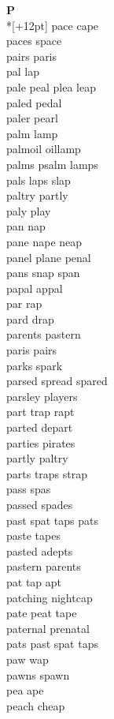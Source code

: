 \vspace{14pt}
\noindent\textbf{\Large P}\\*[+12pt]
pace cape\\
paces space\\
pairs paris\\
pal lap\\
pale peal plea leap\\
paled pedal\\
paler pearl\\
palm lamp\\
palmoil oillamp\\
palms psalm lamps\\
pals laps slap\\
paltry partly\\
paly play\\
pan nap\\
pane nape neap\\
panel plane penal\\
pans snap span\\
papal appal\\
par rap\\
pard drap\\
parents pastern\\
paris pairs\\
parks spark\\
parsed spread spared\\
parsley players\\
part trap rapt\\
parted depart\\
parties pirates\\
partly paltry\\
parts traps strap\\
pass spas\\
passed spades\\
past spat taps pats\\
paste tapes\\
pasted adepts\\
pastern parents\\
pat tap apt\\
patching nightcap\\
pate peat tape\\
paternal prenatal\\
pats past spat taps\\
paw wap\\
pawns spawn\\
pea ape\\
peach cheap\\
